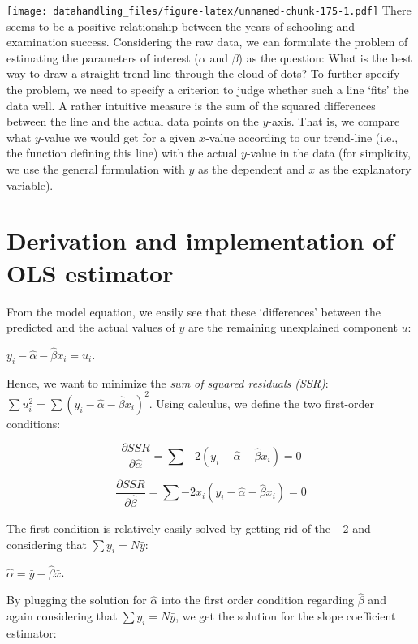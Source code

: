 \documentclass[
  12pt,
]{style/krantz}
\begin{document}
\texttt{[image: datahandling\_files/figure-latex/unnamed-chunk-175-1.pdf]}
There seems to be a positive relationship between the years of schooling and examination success. Considering the raw data, we can formulate the problem of estimating the parameters of interest (\(\alpha\) and \(\beta\)) as the question: What is the best way to draw a straight trend line through the cloud of dots? To further specify the problem, we need to specify a criterion to judge whether such a line `fits' the data well. A rather intuitive measure is the sum of the squared differences between the line and the actual data points on the \(y\)-axis. That is, we compare what \(y\)-value we would get for a given \(x\)-value according to our trend-line (i.e., the function defining this line) with the actual \(y\)-value in the data (for simplicity, we use the general formulation with \(y\) as the dependent and \(x\) as the explanatory variable).

\hypertarget{derivation-and-implementation-of-ols-estimator}{%
\section{Derivation and implementation of OLS estimator}\label{derivation-and-implementation-of-ols-estimator}}

From the model equation, we easily see that these `differences' between the predicted and the actual values of \(y\) are the remaining unexplained component \(u\):

\(y_{i}-\hat{\alpha}-\hat{\beta} x_i=u_i\).

Hence, we want to minimize the \emph{sum of squared residuals (SSR)}: \(\sum{u_i^2}=\sum{(y_{i}-\hat{\alpha}-\hat{\beta} x_i)^2}\). Using calculus, we define the two first-order conditions:

\[\frac{\partial SSR}{\partial \hat{\alpha}}=\sum{-2(y_{i}-\hat{\alpha}-\hat{\beta} x_i)}=0\]

\[\frac{\partial SSR}{\partial \hat{\beta}}=\sum{-2x_i(y_{i}-\hat{\alpha}-\hat{\beta} x_i)}=0\]

The first condition is relatively easily solved by getting rid of the \(-2\) and considering that \(\sum{y_i}=N\bar{y}\):

\(\hat{\alpha}=\bar{y}-\hat{\beta}\bar{x}\).

By plugging the solution for \(\hat{\alpha}\) into the first order condition regarding \(\hat{\beta}\) and again considering that \(\sum{y_i}=N\bar{y}\), we get the solution for the slope coefficient estimator:
\end{document}
